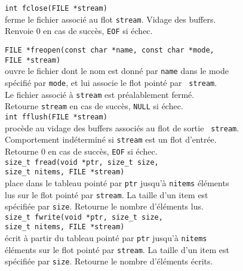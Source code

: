\begin{frame}
{\tt int fclose(FILE *stream)}\\
ferme le fichier associ\'e au flot {\tt stream}. Vidage des buffers.\\
Renvoie 0 en cas de succ\`es, {\tt EOF} si \'echec.\\



{\tt FILE *freopen(const char *name, const char *mode,}\\
\hspace*{10mm} {\tt FILE *stream)}\\
ouvre le fichier dont le nom est donn\'e par {\tt name} dans le mode \\
sp\'ecifi\'e par {\tt mode}, et lui associe le flot point\'e par {\tt
  stream}.\\
Le fichier associ\'e \`a {\tt stream} est pr\'ealablement ferm\'e.\\
Retourne {\tt stream} en cas de succ\`es, {\tt NULL} si \'echec.\\

{\tt int fflush(FILE *stream)}\\
proc\`ede au vidage des buffers associ\'es au flot de sortie {\tt
  stream}.\\
Comportement ind\'etermin\'e si {\tt stream} est un flot d'entr\'ee.\\
Retourne 0 en cas de succ\`es, {\tt EOF} si \'echec.\\

{\tt size\_t fread(void *ptr, size\_t size,}\\
\hspace*{30mm} {\tt size\_t nitems, FILE *stream)}\\
place dans le tableau point\'e par {\tt ptr} jusqu'\`a {\tt nitems}
\'el\'ements \\
lus sur le flot point\'e par {\tt stream}. La taille d'un item est \\
sp\'ecifi\'ee par {\tt size}. Retourne le nombre d'\'el\'ements lus.\\

{\tt size\_t fwrite(void *ptr, size\_t size,}\\
\hspace*{30mm} {\tt size\_t nitems, FILE *stream)}\\
\'ecrit \`a partir du tableau point\'e par {\tt ptr} jusqu'\`a {\tt nitems}\\
\'el\'ements sur le flot point\'e par {\tt stream}. La taille d'un item est \\
sp\'ecifi\'ee par {\tt size}. Retourne le nombre d'\'el\'ements \'ecrits.\\



\end{frame}


